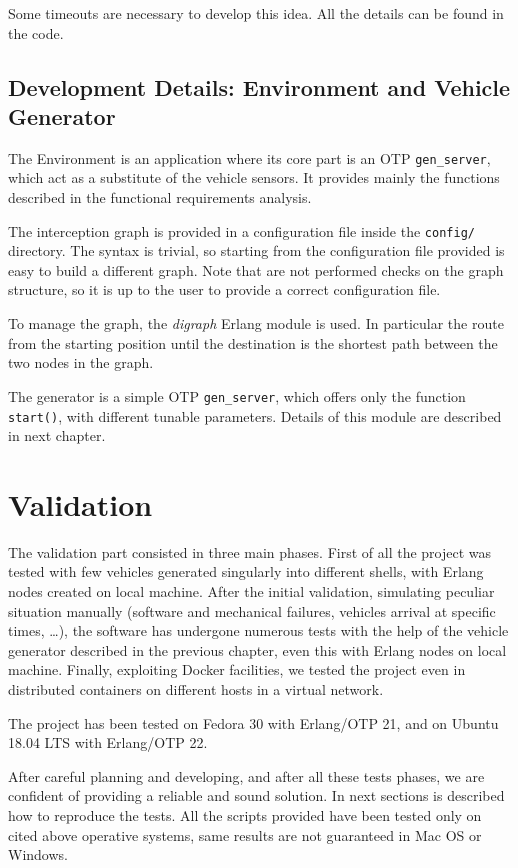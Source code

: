 \documentclass{memoir}
\begin{document}
Some timeouts are necessary to develop this idea. All the details can be found in the code.

\section{Development Details: Environment and Vehicle Generator}
The Environment is an application where its core part is an OTP \verb|gen_server|, which act as a substitute of the vehicle sensors. It provides mainly the functions described in the functional requirements analysis.

The interception graph is provided in a configuration file inside the \verb|config/| directory. The syntax is trivial, so starting from the configuration file provided is easy to build a different graph. Note that are not performed checks on the graph structure, so it is up to the user to provide a correct configuration file.

To manage the graph, the \emph{digraph} Erlang module is used. In particular the route from the starting position until the destination is the shortest path between the two nodes in the graph.

\bigskip
The generator is a simple OTP \verb|gen_server|, which offers only the function \verb|start()|, with different tunable parameters. Details of this module are described in next chapter.

\chapter{Validation}\label{ch:validation}
The validation part consisted in three main phases. First of all the project was tested with few vehicles generated singularly into different shells, with Erlang nodes created on local machine. After the initial validation, simulating peculiar situation manually (software and mechanical failures, vehicles arrival at specific times, \dots), the software has undergone numerous tests with the help of the vehicle generator described in the previous chapter, even this with Erlang nodes on local machine. Finally, exploiting Docker facilities, we tested the project even in distributed containers on different hosts in a virtual network.

The project has been tested on Fedora 30 with Erlang/OTP 21, and on Ubuntu 18.04 LTS with Erlang/OTP 22.

After careful planning and developing, and after all these tests phases, we are confident of providing a reliable and sound solution. In next sections is described how to reproduce the tests. All the scripts provided have been tested only on cited above operative systems, same results are not guaranteed in Mac OS or Windows.
\end{document}
